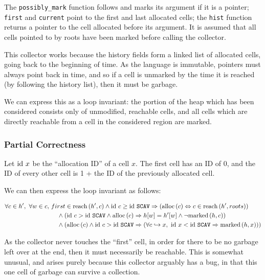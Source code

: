 The \texttt{possibly\_mark} function follows and marks its argument if
it is a pointer; \texttt{first} and \texttt{current} point to the
first and last allocated \glspl{cell}; the \texttt{hist} function
returns a \gls{pointer} to the \gls{cell} allocated before its
argument. It is assumed that all cells pointed to by roots have been
marked before calling the collector.

This \gls{collector} works because the history fields form a linked
list of allocated \glspl{cell}, going back to the beginning of
time. As the language is immutable, \glspl{pointer} must always point
back in time, and so if a \gls{cell} is unmarked by the time it is
reached (by following the history list), then it must be
\gls{garbage}.

We can express this as a \gls{loop invariant}: the portion of the
\gls{heap} which has been considered consists only of unmodified,
reachable \glspl{cell}, and all \glspl{cell} which are directly
reachable from a \gls{cell} in the considered region are marked.

\subsubsection{Partial Correctness}
\label{sec:marksweep-example-partial}

Let $\mathrm{id}~x$ be the ``allocation ID'' of a cell $x$. The first cell has
an ID of 0, and the ID of every other cell is 1 + the ID of the
previously allocated cell.

We can then express the \gls{loop invariant} as follows:

\begin{align*}
  \forall c \in h',\ \forall w \in c,\ &first \in \mathrm{reach}\left(h', c\right) \land
  \mathrm{id}~c \geq \mathrm{id}~\mathtt{SCAV} \Rightarrow (\mathrm{alloc}\left(c\right) \Leftrightarrow c \in
  \mathrm{reach}\left(h', roots\right))\\
  &\quad\land (\mathrm{id}~c > \mathrm{id}~\mathtt{SCAV} \land \mathrm{alloc}\left(c\right) \Rightarrow h[w]
  = h'[w] \land \lnot \mathrm{marked}\left(h, c\right))\\
  &\quad\land (\mathrm{alloc}\left(c\right) \land \mathrm{id}~c > \mathrm{id}~\mathtt{SCAV} \Rightarrow
  (\forall c \hookrightarrow x,\ \mathrm{id}~x < \mathrm{id}~\mathtt{SCAV} \Rightarrow
  \mathrm{marked}\left(h, x\right)))
\end{align*}

As the \gls{collector} never touches the ``first'' \gls{cell}, in
order for there to be no \gls{garbage} left over at the end, then it
must necessarily be reachable. This is somewhat unusual, and arises
purely because this \gls{collector} arguably has a bug, in that this
one \gls{cell} of \gls{garbage} can survive a collection.

